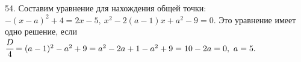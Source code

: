 54. Составим уравнение для нахождения общей точки: $-(x-a)^2+4=2x-5,\ x^2-2(a-1)x+a^2-9=0.$ Это уравнение имеет одно решение, если $\cfrac{D}{4}=(a-1)^2-a^2+9=
a^2-2a+1-a^2+9=10-2a=0,\ a=5.$\\
